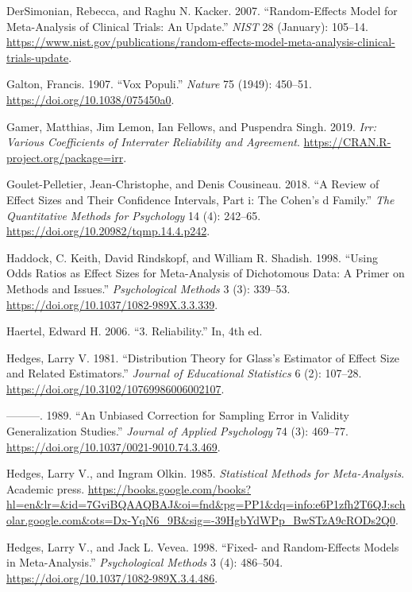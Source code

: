 \documentclass[
  letterpaper,
  DIV=11,
  numbers=noendperiod]{scrreprt}
\newlength{\cslhangindent}
\newenvironment{CSLReferences}[2] %
 {\begin{list}{}{%
  \setlength{\itemindent}{0pt}
  \setlength{\leftmargin}{0pt}
  \setlength{\parsep}{0pt}
  \ifodd #1
   \setlength{\leftmargin}{\cslhangindent}
   \setlength{\itemindent}{-1\cslhangindent}
  \fi
  \setlength{\itemsep}{#2\baselineskip}}}
 {\end{list}}
\begin{document}
\begin{CSLReferences}{1}{0}
DerSimonian, Rebecca, and Raghu N. Kacker. 2007. {``Random-Effects Model
for Meta-Analysis of Clinical Trials: An Update.''} \emph{NIST} 28
(January): 105--14.
\url{https://www.nist.gov/publications/random-effects-model-meta-analysis-clinical-trials-update}.

Galton, Francis. 1907. {``Vox Populi.''} \emph{Nature} 75 (1949):
450--51. \url{https://doi.org/10.1038/075450a0}.

Gamer, Matthias, Jim Lemon, Ian Fellows, and Puspendra Singh. 2019.
\emph{Irr: Various Coefficients of Interrater Reliability and
Agreement}. \url{https://CRAN.R-project.org/package=irr}.

Goulet-Pelletier, Jean-Christophe, and Denis Cousineau. 2018. {``A
Review of Effect Sizes and Their Confidence Intervals, Part i: The
Cohen{'}s d Family.''} \emph{The Quantitative Methods for Psychology} 14
(4): 242--65. \url{https://doi.org/10.20982/tqmp.14.4.p242}.

Haddock, C. Keith, David Rindskopf, and William R. Shadish. 1998.
{``Using Odds Ratios as Effect Sizes for Meta-Analysis of Dichotomous
Data: A Primer on Methods and Issues.''} \emph{Psychological Methods} 3
(3): 339--53. \url{https://doi.org/10.1037/1082-989X.3.3.339}.

Haertel, Edward H. 2006. {``3. Reliability.''} In, 4th ed.

Hedges, Larry V. 1981. {``Distribution Theory for Glass's Estimator of
Effect Size and Related Estimators.''} \emph{Journal of Educational
Statistics} 6 (2): 107--28.
\url{https://doi.org/10.3102/10769986006002107}.

---------. 1989. {``An Unbiased Correction for Sampling Error in
Validity Generalization Studies.''} \emph{Journal of Applied Psychology}
74 (3): 469--77. \url{https://doi.org/10.1037/0021-9010.74.3.469}.

Hedges, Larry V., and Ingram Olkin. 1985. \emph{Statistical Methods for
Meta-Analysis}. Academic press.
\url{https://books.google.com/books?hl=en&lr=&id=7GviBQAAQBAJ&oi=fnd&pg=PP1&dq=info:e6P1zfh2T6QJ:scholar.google.com&ots=Dx-YqN6_9B&sig=-39HgbYdWPp_BwSTzA9cRODs2Q0}.

Hedges, Larry V., and Jack L. Vevea. 1998. {``Fixed- and Random-Effects
Models in Meta-Analysis.''} \emph{Psychological Methods} 3 (4):
486--504. \url{https://doi.org/10.1037/1082-989X.3.4.486}.


\end{CSLReferences}
\end{document}
